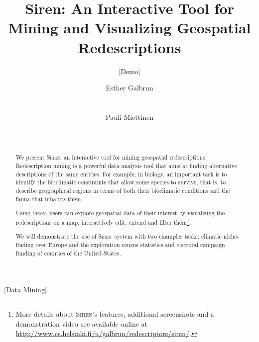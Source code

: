 \documentclass{sig-alternate}
\newcommand{\Siren}{\textsc{Siren}}
\begin{document}
\setlength{\pdfpageheight}{11in}%
\setlength{\pdfpagewidth}{8.5in}%


\title{Siren: An Interactive Tool for Mining and Visualizing Geospatial Redescriptions}
\subtitle{[Demo]}

\author{
\alignauthor
Esther Galbrun\\
       \\
       \\
\alignauthor
Pauli Miettinen\\
       \\
       \\
}

\maketitle
\begin{abstract}
  We present \Siren, an interactive tool for mining geospatial
  redescriptions.  Redescription mining is a powerful data analysis
  tool that aims at finding alternative descriptions of the same
  entities.  For example, in biology, an important task is to identify
  the bioclimatic constraints that allow some species to survive, that
  is, to describe geographical regions in terms of both their
  bioclimatic conditions and the fauna that inhabits them.  
  
Using \Siren, users can explore geospatial data of their
  interest by visualizing the redescriptions on a map, interactively
  edit, extend and filter them\footnote{More details about \Siren's
    features, additional screenshots and a demonstration video are available online at
    \url{http://www.cs.helsinki.fi/u/galbrun/redescriptors/siren/}.}.

  We will demonstrate the use of \Siren\ system with two examples tasks:
  climatic niche-finding over Europe and the exploration census statistics and
  electoral campaign funding of counties of the United-States.
\end{abstract}

[Data Mining]
\end{document}

